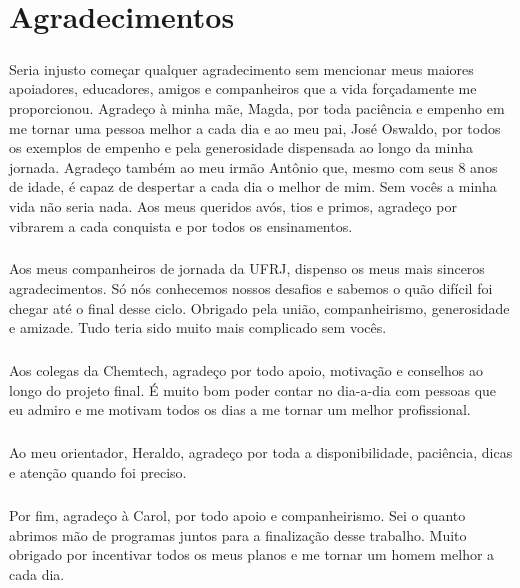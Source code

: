 \documentclass[grad,numbers]{coppe}
\begin{document}
  \frontmatter
  
  \makecatalog
  
  \dedication{Aos familiares e amigos.}

  \chapter*{Agradecimentos}

  \paragraph{}Seria injusto começar qualquer agradecimento sem mencionar meus maiores apoiadores, educadores, amigos e companheiros que a vida forçadamente me proporcionou. Agradeço à minha mãe, Magda, por toda paciência e empenho em me tornar uma pessoa melhor a cada dia e ao meu pai, José Oswaldo, por todos os exemplos de empenho e pela generosidade dispensada ao longo da minha jornada. Agradeço também ao meu irmão Antônio que, mesmo com seus 8 anos de idade, é capaz de despertar a cada dia o melhor de mim. Sem vocês a minha vida não seria nada. Aos meus queridos avós, tios e primos, agradeço por vibrarem a cada conquista e por todos os ensinamentos.
  
  \paragraph{}Aos meus companheiros de jornada da UFRJ, dispenso os meus mais sinceros agradecimentos. Só nós conhecemos nossos desafios e sabemos o quão difícil foi chegar até o final desse ciclo. Obrigado pela união, companheirismo, generosidade e amizade. Tudo teria sido muito mais complicado sem vocês.
  
  \paragraph{}Aos colegas da Chemtech, agradeço por todo apoio, motivação e conselhos ao longo do projeto final. É muito bom poder contar no dia-a-dia com pessoas que eu admiro e me motivam todos os dias a me tornar um melhor profissional.
  
  \paragraph{}Ao meu orientador, Heraldo, agradeço por toda a disponibilidade, paciência, dicas e atenção quando foi preciso.
  
  \paragraph{}Por fim, agradeço à Carol, por todo apoio e companheirismo. Sei o quanto abrimos mão de programas juntos para a finalização desse trabalho. Muito obrigado por incentivar todos os meus planos e me tornar um homem melhor a cada dia.
\end{document}
